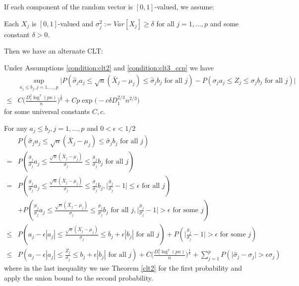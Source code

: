 \documentclass[mnsc,blindrev]{informs4} %
\newcommand{\abs}[1]{\left \vert #1 \right\vert}
\begin{document}
If each component of the random vector is $[0,1]$-valued, we assume:
\begin{assumption}\label{condition:clt3_ccp}
Each $X_j$ is $[0,1]$-valued and $\sigma_j^2:=Var[X_j]\geq \delta$ for all $j=1,\ldots,p$ and some constant $\delta>0$.
\end{assumption}
Then we have an alternate CLT:
\begin{theorem}\label{clt3:ccp}
Under Assumptions \ref{condition:clt2} and \ref{condition:clt3_ccp} we have
\begin{align*}
&\sup_{a_j\leq b_j,j=1,\ldots,p}\Big\lvert P(\hat\sigma_ja_j\leq \sqrt n(\bar{X}_j-\mu_j)\leq \hat\sigma_jb_j\text{ for all }j)-P(\sigma_ja_j\leq Z_j\leq \sigma_jb_j\text{ for all }j)\Big\rvert\\
\leq&C\Big(\frac{D_1^2\log^7(pn)}{n}\Big)^{\frac{1}{6}}+Cp\exp\big(-c\delta D_1^{2/3}n^{2/3}\big)
\end{align*}
for some universal constants $C,c$.
\end{theorem}
 For any $a_j\leq b_j,j=1,\ldots,p$ and $0<\epsilon<1/2$
\begin{align*}
&P(\hat\sigma_ja_j\leq \sqrt n(\bar{X}_j-\mu_j)\leq\hat\sigma_j b_j\text{ for all }j)\\
=&P(\frac{\hat\sigma_j}{\sigma_j}a_j\leq \frac{\sqrt n(\bar{X}_j-\mu_j)}{\sigma_j}\leq\frac{\hat\sigma_j}{\sigma_j} b_j\text{ for all }j)\\
=&P(\frac{\hat\sigma_j}{\sigma_j}a_j\leq \frac{\sqrt n(\bar{X}_j-\mu_j)}{\sigma_j}\leq\frac{\hat\sigma_j}{\sigma_j} b_j,\big\lvert\frac{\hat\sigma_j}{\sigma_j}-1\big\rvert\leq \epsilon\text{ for all }j)\\
&+P(\frac{\hat\sigma_j}{\sigma_j}a_j\leq \frac{\sqrt n(\bar{X}_j-\mu_j)}{\sigma_j}\leq\frac{\hat\sigma_j}{\sigma_j} b_j\text{ for all }j,\big\lvert\frac{\hat\sigma_j}{\sigma_j}-1\big\rvert> \epsilon\text{ for some }j)\\
\leq &P(a_j-\epsilon \abs{a_j}\leq \frac{\sqrt n(\bar{X}_j-\mu_j)}{\sigma_j}\leq b_j+\epsilon \abs{b_j}\text{ for all }j)+P(\big\lvert\frac{\hat\sigma_j}{\sigma_j}-1\big\rvert> \epsilon\text{ for some }j)\\
\leq & P(a_j-\epsilon \abs{a_j}\leq \frac{Z_j}{\sigma_j}\leq b_j+\epsilon \abs{b_j}\text{ for all }j)+C\Big(\frac{D_1^2\log^7(pn)}{n}\Big)^{\frac{1}{6}}+\sum_{j=1}^pP(\big\lvert\hat\sigma_j-\sigma_j\big\rvert> \epsilon\sigma_j)
\end{align*}
where in the last inequality we use Theorem \ref{clt2} for the first probability and apply the union bound to the second probability.
\end{document}

